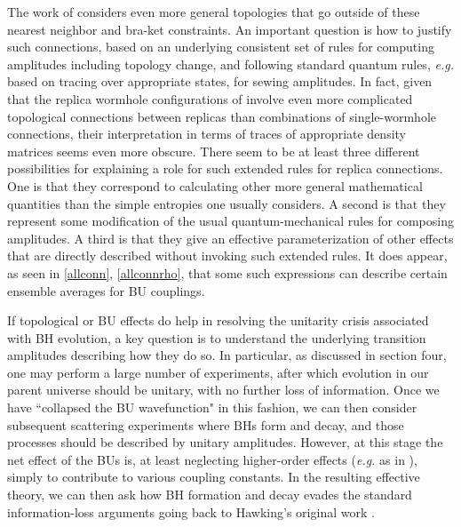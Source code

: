 \documentclass[12pt]{article}
\numberwithin{equation}{section}
\begin{document}
The work of  \cite{Penington:2019kki, Almheiri:2019qdq} considers even more general topologies that go outside of these nearest neighbor and bra-ket constraints.  An important question is how to justify such connections, based on an underlying consistent set of rules for computing amplitudes including topology change, and following standard quantum rules, {\it e.g.} based on tracing over appropriate states, for sewing amplitudes.  In fact, given that the replica wormhole configurations of \cite{Penington:2019kki, Almheiri:2019qdq} involve even more complicated topological connections between replicas than combinations of single-wormhole connections, their interpretation in terms of traces of appropriate density matrices seems even more obscure.
There seem to be at least three different possibilities for explaining a role for such extended rules for replica connections.  One is that they correspond to calculating other more general mathematical quantities than the simple entropies one usually considers.  A second is that they represent some modification of the usual quantum-mechanical rules for composing amplitudes.  A third is that they give an effective parameterization of other effects that are directly described without invoking such extended rules.  It does appear, as seen in \eqref{allconn}, \eqref{allconnrho}, that some such expressions can describe certain ensemble averages for BU couplings.

If topological or BU effects do help in resolving the unitarity crisis associated with BH evolution, a key question is to understand the underlying transition amplitudes describing how they do so.  In particular, as discussed in section four, one may perform a large number of experiments, after which evolution in our parent universe should be unitary, with no further loss of information.  Once we have ``collapsed the BU wavefunction" in this fashion, we can then consider subsequent scattering experiments where BHs form and decay, and those processes should be described by unitary amplitudes.  However, at this stage the net effect of the BUs is, at least neglecting higher-order effects ({\it e.g.} as in \cite{GiSt3Q}), simply to contribute to various coupling constants.  In the resulting effective theory, we can then ask how BH formation and decay evades the standard information-loss arguments going back to Hawking's original work \cite{Hawking:1974sw}.
\end{document}
